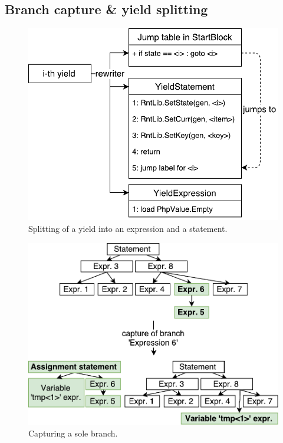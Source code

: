 \subsection{Branch capture \& yield splitting}

\begin{figure}[h]
	\centering	
	\includegraphics[scale=0.75]{../img/5_2_yieldSplitting}	
	\caption{Splitting of a yield into an expression and a statement.}
	\label{fig5.2:Splitting}
\end{figure}

\begin{figure}[h]
	\centering	
	\includegraphics[scale=0.75]{../img/5_2_capturing}	
	\caption{Capturing a sole branch.}
	\label{fig5.2:CaptureBranch}
\end{figure}

